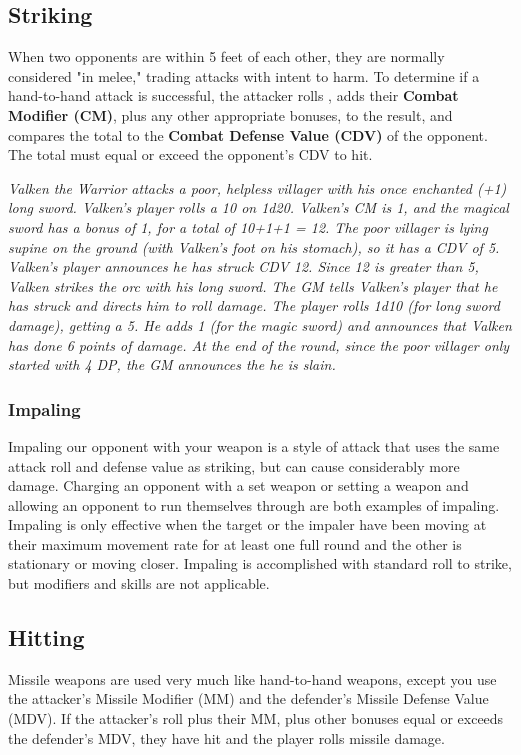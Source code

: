 \begin{multicols*}{2}
\begin{multicols*}{2}
\end{multicols*}
\subsection{Striking}
When two opponents are within 5 feet of each other, they are normally considered "in melee," trading attacks with intent to harm. To determine if a hand-to-hand attack is successful, the attacker rolls , adds their \textbf{Combat Modifier (CM)}, plus any other appropriate bonuses, to the result, and compares the total to the \textbf{Combat Defense Value (CDV)} of the opponent. The total must equal or exceed the opponent's CDV to hit.

\textit{Valken the Warrior attacks a poor, helpless villager with his once enchanted (+1) long sword. Valken's player rolls a 10 on 1d20. Valken's CM is 1, and the magical sword has a bonus of 1, for a total of 10+1+1 = 12. The poor villager is lying supine on the ground (with Valken's foot on his stomach), so it has a CDV of 5. Valken's player announces he has struck CDV 12. Since 12 is greater than 5, Valken strikes the orc with his long sword. The GM tells Valken's player that he has struck and directs him to roll damage. The player rolls 1d10 (for long sword damage), getting a 5. He adds 1 (for the magic sword) and announces that Valken has done 6 points of damage. At the end of the round, since the poor villager only started with 4 DP, the GM announces the he is slain.}
\subsubsection{Impaling}
Impaling our opponent with your weapon is a style of attack that uses the same attack roll and defense value as striking, but can cause considerably more damage. Charging an opponent with a set weapon or setting a weapon and allowing an opponent to run themselves through are both examples of impaling. Impaling is only effective when the target or the impaler have been moving at their maximum movement rate for at least one full round and the other is stationary or moving closer. Impaling is accomplished with  standard roll to strike, but modifiers and skills are not applicable.
\subsection{Hitting}
Missile weapons are used very much like hand-to-hand weapons, except you use the attacker's Missile Modifier (MM) and the defender's Missile Defense Value (MDV). If the attacker's  roll plus their MM, plus other bonuses equal or exceeds the defender's MDV, they have hit and the player rolls missile damage.

\end{multicols*}
